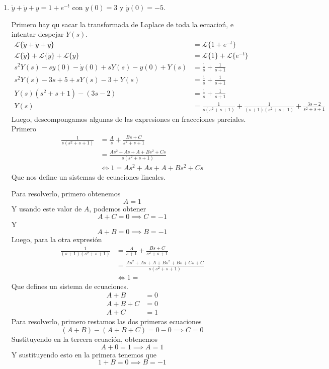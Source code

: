 \documentclass{article}
\begin{document}
\begin{enumerate}
        \item {
        	$\ddot y + \dot y + y = 1 + e^{-t}$ con $y(0) = 3$ y $\dot y(0) = -5$.
        	
        	\color{azul}
        	
        	Primero hay qu sacar la transformada de 
        	Laplace de toda la ecuacioń, e intentar despejar $Y(s)$.
        	\begin{align*}
        	\mathcal{L}\{\ddot y + \dot y + y\} &= \mathcal{L}\{1 + e^{-t}\}\\
        	\mathcal{L}\{\ddot y\} + \mathcal{L}\{\dot y\} + \mathcal{L}\{y\}
        	&= \mathcal{L}\{1\} + \mathcal{L}\{e^{-t}\} \\
        	s^2 Y(s) - s y(0) - \dot y(0) + sY(s) - y(0) + Y(s) &= \frac{1}{s}
        	+ \frac{1}{s+1} \\
        	s^2 Y(s) - 3s + 5 + s Y(s) - 3 + Y(s) &= \frac{1}{s} + \frac{1}{s+1}\\
        	Y(s) (s^2 + s + 1) - (3s-2) &= \frac{1}{s} + \frac{1}{s+1}\\
        	Y(s) &= \frac{1}{s(s^2 + s + 1)} + \frac{1}{(s+1)(s^2 + s + 1)} 
        	+ \frac{3s-2}{s^2 + s + 1}
        	\end{align*}
        	Luego, descompongamos algunas de las expresiones en fraccciones
        	parciales.
        	Primero
        	\begin{align*}
        	\frac{1}{s(s^2+s+1)} &= \frac{A}{s} + \frac{Bs + C}{s^2+s+1} \\
        	&= \frac{As^2+As+A+Bs^2+Cs}{s(s^2+s+1)} \\
        	&\iff 1 = As^2+As+A+Bs^2+Cs
        	\end{align*}
        	Que nos define un sistemas de ecuaciones lineales.
        	
        	Para resolverlo, primero obtenemos
        	\[A = 1\]
        	Y usando este valor de $A$, podemos obtener
        	\[A + C = 0 \implies C = -1\]
        	Y
        	\[A + B = 0 \implies B = -1\]
        	Luego, para la otra expresión
        	\begin{align*}
        	\frac{1}{(s+1)(s^2 + s + 1)} &= \frac{A}{s+1} + \frac{Bs+C}{s^2+s+1} \\
        	&= \frac{As^2+As+A+Bs^2+Bs+Cs+C}{s(s^2+s+1)} \\
        	&\iff 1 = 
        	\end{align*}
        	Que defines un sistema de ecuaciones.
        	\begin{align*}
        	A + B &= 0 \\
        	A + B + C &= 0 \\
        	A + C &= 1
        	\end{align*}
        	Para resolverlo, primero restamos las dos primeras ecuaciones
        	\[(A+B)-(A+B+C) = 0 - 0 \implies C = 0\]
        	Sustituyendo en la tercera ecuación, obtenemos
        	\[A + 0 = 1 \implies A = 1\]
        	Y sustituyendo esto en la primera tenemos que
        	\[1 + B = 0 \implies B = -1\]
        	
}
\end{enumerate}
\end{document}
